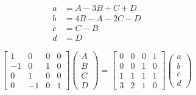 \begin{align}
a &= A-3B+C+D \nonumber \\
b &= 4B-A-2C-D \nonumber \\
c &= C-B \nonumber \\
d &= D
\end{align}

\begin{equation}
\left[ \begin{matrix}
1 & 0 & 0 & 0 \\
-1 & 0 & 1 & 0 \\
0 & 1 & 0 & 0 \\
0 & -1 & 0 & 1 
\end{matrix} \right]
\left( \begin{matrix} A \\ B\\ C \\D\end{matrix}\right) = \left[ \begin{matrix}
0 & 0 & 0 & 1 \\
0 & 0 & 1 & 0 \\
1 & 1 & 1 & 1 \\
3 & 2 & 1 & 0 
\end{matrix} \right]
\left( \begin{matrix} a \\ b\\ c \\d\end{matrix}\right)
\end{equation}